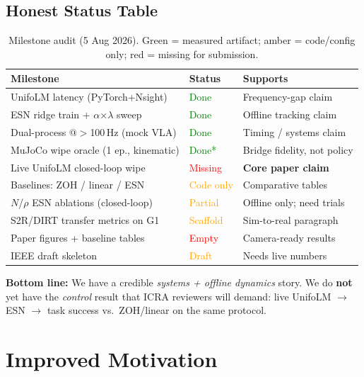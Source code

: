 \documentclass[conference]{IEEEtran}
\begin{document}
\subsection{Honest Status Table}
\begin{table}[h]
\centering
\caption{Milestone audit (5 Aug 2026). Green = measured artifact; amber = code/config only; red = missing for submission.}
\label{tab:audit}
\scriptsize
\begin{tabularx}{\columnwidth}{@{}p{} l X@{}}
\toprule
\textbf{Milestone} & \textbf{Status} & \textbf{Supports} \\
\midrule
UnifoLM latency (PyTorch+Nsight) & \textcolor{green}{Done} & Frequency-gap claim \\
ESN ridge train + $\alpha$$\times$$\lambda$ sweep & \textcolor{green}{Done} & Offline tracking claim \\
Dual-process @$>$100\,Hz (mock VLA) & \textcolor{green}{Done} & Timing / systems claim \\
MuJoCo wipe oracle (1 ep., kinematic) & \textcolor{green}{Done*} & Bridge fidelity, not policy \\
Live UnifoLM closed-loop wipe & \textcolor{red}{Missing} & \textbf{Core paper claim} \\
Baselines: ZOH / linear / ESN & \textcolor{orange}{Code only} & Comparative tables \\
$N$/$\rho$ ESN ablations (closed-loop) & \textcolor{orange}{Partial} & Offline only; need trials \\
S2R/DIRT transfer metrics on G1 & \textcolor{orange}{Scaffold} & Sim-to-real paragraph \\
Paper figures + baseline tables & \textcolor{red}{Empty} & Camera-ready results \\
IEEE draft skeleton & \textcolor{orange}{Draft} & Needs live numbers \\
\bottomrule
\end{tabularx}
\end{table}

\noindent\textbf{Bottom line:} We have a credible \emph{systems + offline dynamics} story.
We do \textbf{not} yet have the \emph{control} result that ICRA reviewers will demand: live UnifoLM $\to$ ESN $\to$ task success vs.\ ZOH/linear on the same protocol.

\section{Improved Motivation}
\end{document}
